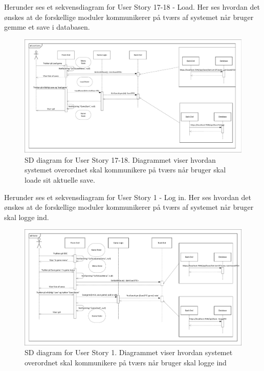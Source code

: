 \noindent Herunder ses et sekvensdiagram for User Story 17-18 - Load. Her ses hvordan det ønskes at de forskellige moduler kommunikerer på tværs af systemet når bruger gemme et save i databasen.
\begin{figure}[h]
\centering
\includegraphics[width = \textwidth]{02-Body/Images/Arkitektur - SD Load Game}
\caption{SD diagram for User Story 17-18. Diagrammet viser hvordan systemet overordnet skal kommunikere på tværs når bruger skal loade sit aktuelle save. }
\label{fig:Arkitektur-SD-LoadGame}
\end{figure}

\noindent Herunder ses et sekvensdiagram for User Story 1 - Log in. Her ses hvordan det ønskes at de forskellige moduler kommunikerer på tværs af systemet når bruger skal logge ind.
\begin{figure}[h]
\centering
\includegraphics[width = \textwidth]{02-Body/Images/Arkitektur - SD Login}
\caption{SD diagram for User Story 1. Diagrammet viser hvordan systemet overordnet skal kommunikere på tværs når bruger skal logge ind}
\label{fig:Arkitektur-SD-Login}
\end{figure}

